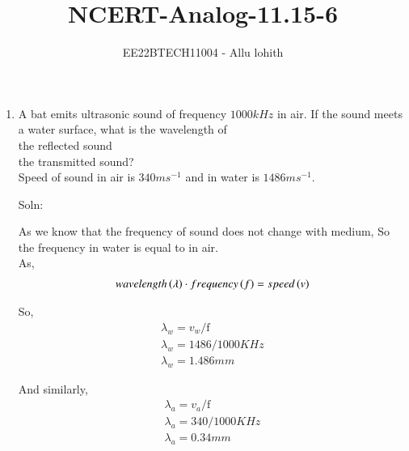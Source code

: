 \documentclass[journal,12pt,twocolumn]{IEEEtran}
\theoremstyle{remark}
\begin{document}

\vspace{3cm}

\title{NCERT-Analog-11.15-6}
\author{EE22BTECH11004 - Allu lohith}

\maketitle
\newpage
\bigskip

\renewcommand{\thefigure}{\theenumi}
\renewcommand{\thetable}{\theenumi}
\begin{enumerate}
\item A bat emits ultrasonic sound of frequency $1000 kHz$ in air. If the sound meets a water surface, what is the wavelength of\\[0pt] \brak the reflected sound \\[0pt]
 the transmitted sound?\\
Speed of sound in air is $340 ms^{-1}$ and in water is $1486 ms^{-1}$.
\item[Soln:]

As we know that the frequency of sound does not change with medium, So the frequency in water is equal to in air.\\
As,
\begin{align}
wavelength\left(\lambda\right)\cdot frequency\left(f\right)=speed\left(v\right)
\end{align}
\begin{table}[htbp]
\centering

\vspace{0.5cm}
\caption{\normalsize $Parameters$}
\label{tab:parameters}
\end{table}

So,
\begin{align}
\lambda_w=v_w/ \mathrm{f}\\
\lambda_w=1486/1000KHz\\
\lambda_w=1.486mm    
\end{align}

And similarly,
\begin{align}
\lambda_a=v_a/\mathrm{f}\\
\lambda_a=340/1000KHz\\
\lambda_a=0.34mm    
\end{align}


\end{enumerate}
\end{document}
